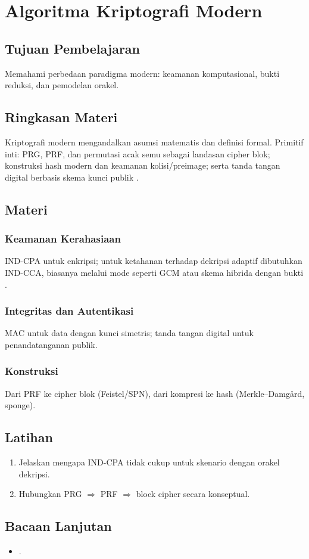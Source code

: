 \documentclass[../main.tex]{subfiles}
\begin{document}
\chapter{Algoritma Kriptografi Modern}
\section{Tujuan Pembelajaran}
Memahami perbedaan paradigma modern: keamanan komputasional, bukti reduksi, dan pemodelan orakel.

\section{Ringkasan Materi}
Kriptografi modern mengandalkan asumsi matematis dan definisi formal. Primitif inti: PRG, PRF, dan permutasi acak semu sebagai landasan cipher blok; konstruksi hash modern dan keamanan kolisi/preimage; serta tanda tangan digital berbasis skema kunci publik \citep{bonehshoup,bellare_rogaway_notes}.

\section{Materi}
\subsection{Keamanan Kerahasiaan}
IND-CPA untuk enkripsi; untuk ketahanan terhadap dekripsi adaptif dibutuhkan IND-CCA, biasanya melalui mode seperti GCM atau skema hibrida dengan bukti \citep{bellare_rogaway_notes}.

\subsection{Integritas dan Autentikasi}
MAC untuk data dengan kunci simetris; tanda tangan digital untuk penandatanganan publik.

\subsection{Konstruksi}
Dari PRF ke cipher blok (Feistel/SPN), dari kompresi ke hash (Merkle–Damgård, sponge).

\section{Latihan}
\begin{enumerate}
  \item Jelaskan mengapa IND-CPA tidak cukup untuk skenario dengan orakel dekripsi.
  \item Hubungkan PRG \(\Rightarrow\) PRF \(\Rightarrow\) block cipher secara konseptual.
\end{enumerate}

\section{Bacaan Lanjutan}
\begin{itemize}
  \item \citep{bonehshoup,bellare_rogaway_notes}.
\end{itemize}
\end{document}

